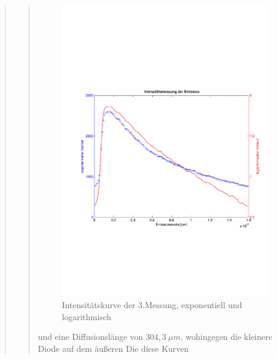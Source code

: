 \begin{quote}
\begin{quote}
        \begin{figure}[H]
                    \centering
                        \includegraphics[scale=0.53, trim = 1cm 6cm 1.5cm 8cm,
                        clip]{./Emissionsbilder/drei/Intensitatsmessung.pdf}
                        \caption{Intensitätskurve der 3.Messung, exponentiell
                        und logarithmisch}
                            \label{fig:./Emissionsbilder/drei/Intensitatsmessung.pdf}
        \end{figure}

        und eine Diffusionslänge von $304,3\ \mu m$, wohingegen die kleinere
        Diode auf dem äußeren Die diese Kurven


\end{quote}
\end{quote}
